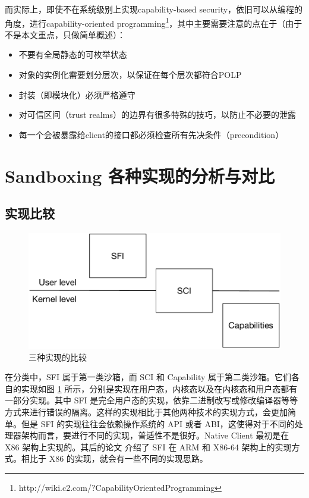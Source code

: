 \documentclass[final,12pt]{elsarticle}
\begin{document}
而实际上，即使不在系统级别上实现capability-based security，依旧可以从编程的角度，进行capability-oriented programming\footnote{http://wiki.c2.com/?CapabilityOrientedProgramming}，其中主要需要注意的点在于（由于不是本文重点，只做简单概述）：
\begin{itemize}
	\item
	不要有全局静态的可枚举状态
	\item
	对象的实例化需要划分层次，以保证在每个层次都符合POLP
	\item
	封装（即模块化）必须严格遵守
	\item
	对可信区间（trust realms）的边界有很多特殊的技巧，以防止不必要的泄露
	\item
	每一个会被暴露给client的接口都必须检查所有先决条件（precondition）
\end{itemize}

\section{Sandboxing 各种实现的分析与对比}
\label{s:evaluation}

\subsection{实现比较}
\label{ss: comparision}

\begin{figure}
\centering
\includegraphics[width=0.7\linewidth]{imgs/difference}
\caption{三种实现的比较}
\label{fig:difference}
\end{figure}

在分类中，SFI 属于第一类沙箱，而 SCI 和 Capability 属于第二类沙箱。它们各自的实现如图 \ref{fig:difference} 所示，分别是实现在用户态，内核态以及在内核态和用户态都有一部分实现。其中 SFI 是完全用户态的实现，依靠二进制改写或修改编译器等等方式来进行错误的隔离。这样的实现相比于其他两种技术的实现方式，会更加简单。但是 SFI 的实现往往会依赖操作系统的 API 或者 ABI，这使得对于不同的处理器架构而言，要进行不同的实现，普适性不是很好。Native Client 最初是在 X86 架构上实现的。其后的论文 \cite{sehr2010adapting} 介绍了 SFI 在 ARM 和 X86-64 架构上的实现方式。相比于 X86 的实现，就会有一些不同的实现思路。
\end{document}
